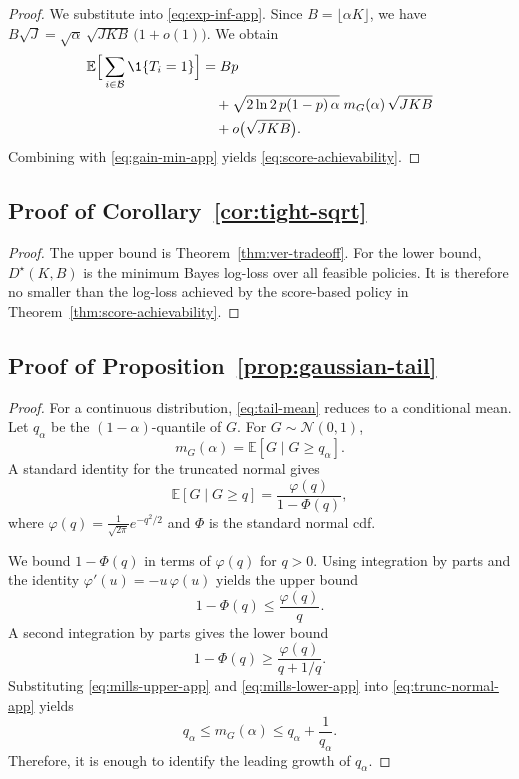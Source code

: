 \documentclass[twocolumn]{scholar7}
\newcommand{\cB}{\mathcal{B}}
\newcommand{\E}{\mathbb{E}}
\begin{document}
\begin{appendix}
\begin{proof}
We substitute into \eqref{eq:exp-inf-app}.
Since $B=\lfloor \alpha K\rfloor$, we have $B\sqrt{J}=\sqrt{\alpha}\,\sqrt{J K B}\,\big(1+o(1)\big)$.
We obtain
\begin{align*}
\E\Big[\sum_{i\in\cB}\1\{T_i=1\}\Big]
&=
Bp\\
&\quad+\sqrt{2\ln 2\,p(1-p)\,\alpha}\;m_G(\alpha)\,\sqrt{J K B}\\
&\quad+o\big(\sqrt{J K B}\big).
\end{align*}
Combining with \eqref{eq:gain-min-app} yields \eqref{eq:score-achievability}.
\end{proof}

\subsection{Proof of Corollary~\ref{cor:tight-sqrt}}
\begin{proof}
The upper bound is Theorem~\ref{thm:ver-tradeoff}.
For the lower bound, $D^\star(K,B)$ is the minimum Bayes log-loss over all feasible policies.
It is therefore no smaller than the log-loss achieved by the score-based policy in Theorem~\ref{thm:score-achievability}.
\end{proof}

\subsection{Proof of Proposition~\ref{prop:gaussian-tail}}
\begin{proof}
For a continuous distribution, \eqref{eq:tail-mean} reduces to a conditional mean.
Let $q_\alpha$ be the $(1-\alpha)$-quantile of $G$.
For $G\sim\mathcal N(0,1)$,
\[
m_G(\alpha)=\E[G\mid G\ge q_\alpha].
\]
A standard identity for the truncated normal gives
\begin{equation}
\label{eq:trunc-normal-app}
\E[G\mid G\ge q]=\frac{\varphi(q)}{1-\Phi(q)},
\end{equation}
where $\varphi(q)=\frac{1}{\sqrt{2\pi}}e^{-q^2/2}$ and $\Phi$ is the standard normal cdf.

We bound $1-\Phi(q)$ in terms of $\varphi(q)$ for $q>0$.
Using integration by parts and the identity $\varphi'(u)=-u\,\varphi(u)$ yields the upper bound
\begin{equation}
\label{eq:mills-upper-app}
1-\Phi(q)\le \frac{\varphi(q)}{q}.
\end{equation}
A second integration by parts gives the lower bound
\begin{equation}
\label{eq:mills-lower-app}
1-\Phi(q)\ge \frac{\varphi(q)}{q+1/q}.
\end{equation}
Substituting \eqref{eq:mills-upper-app} and \eqref{eq:mills-lower-app} into \eqref{eq:trunc-normal-app} yields
\[
q_\alpha \le m_G(\alpha)\le q_\alpha+\frac{1}{q_\alpha}.
\]
Therefore, it is enough to identify the leading growth of $q_\alpha$.


\end{proof}
\end{appendix}
\end{document}
